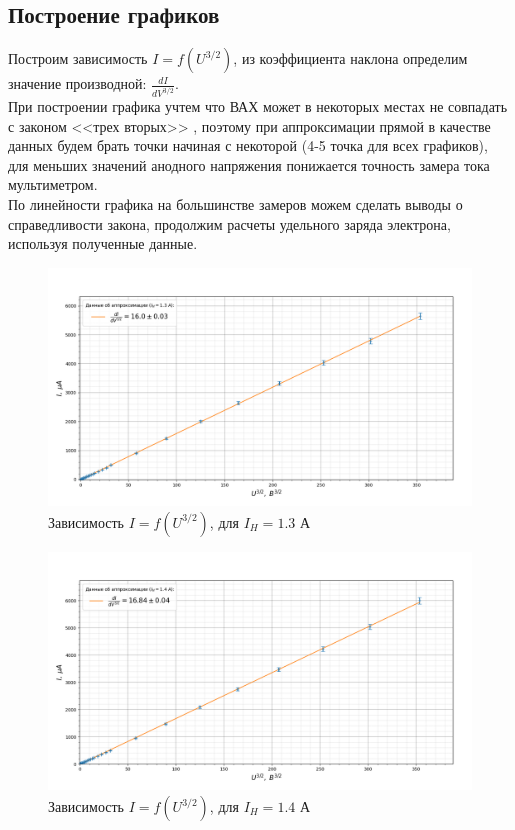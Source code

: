 \documentclass[a4paper, 12pt]{article}%
\begin{document}
	\subsection{Построение графиков}
	Построим зависимость $I=f(U^{3/2})$, из коэффициента наклона определим значение производной: $\frac{dI}{dV^{3/2}}$.\\
	При построении графика учтем что ВАХ может в некоторых местах не совпадать с законом <<трех вторых>> , поэтому при аппроксимации прямой в качестве данных будем брать точки начиная с некоторой (4-5 точка для всех графиков), для меньших значений анодного напряжения понижается точность замера тока мультиметром. \\
	По линейности графика на большинстве замеров можем сделать выводы о справедливости закона, продолжим расчеты удельного заряда электрона, используя полученные данные.
	\begin{figure}[H]
		\centering
		\includegraphics[width=0.9\linewidth]{1.3}
		\caption{Зависимость $I=f(U^{3/2})$, для $I_H = 1.3$ А}
		\label{fig:1}
	\end{figure}
	\begin{figure}[H]
		\centering
		\includegraphics[width=0.9\linewidth]{1.4}
		\caption{Зависимость $I=f(U^{3/2})$, для $I_H = 1.4$ А}
		\label{fig:1}
	\end{figure}
\end{document}
